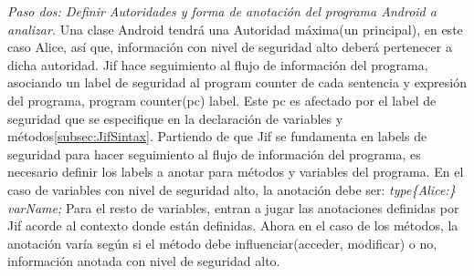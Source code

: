 \textit{Paso dos: Definir Autoridades y forma de anotación del programa Android
a analizar.}\newline
Una clase Android tendrá una Autoridad máxima(un principal), en este caso Alice,
así que, información con nivel de seguridad alto deberá pertenecer a dicha
autoridad.\newline
Jif hace seguimiento al flujo de información del programa, asociando un label
de seguridad al program counter de cada sentencia y expresión del programa,
program counter(pc) label. Este pc es afectado por el label de seguridad que se
especifique en la declaración de variables y métodos\ref{subsec:JifSintax}. 
Partiendo de que Jif se fundamenta en labels de seguridad para hacer seguimiento
al flujo de información del programa, es necesario definir los labels a
anotar para métodos y variables del programa.\newline
En el caso de variables con nivel de seguridad  alto, la anotación debe
ser:\newline
\emph{ type\{Alice:\} varName; }\newline
Para el resto de variables, entran a jugar las anotaciones definidas por Jif
acorde al contexto donde están definidas.\newline
Ahora en el caso de los métodos, la anotación varía según si el método debe
influenciar(acceder, modificar) o no, información anotada con nivel de seguridad
alto.


